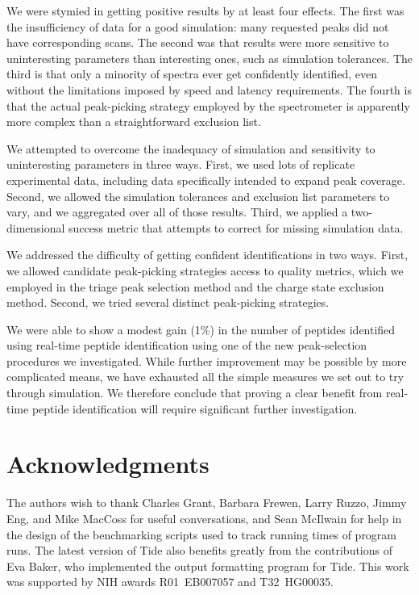 \documentclass[12pt,twoside,openright]{report}
\let\origdoublepage\cleardoublepage
\newcommand{\clearemptydoublepage}{
  \clearpage{\pagestyle{empty}\origdoublepage}
}
\let\cleardoublepage\clearemptydoublepage
\begin{document}
We were stymied in getting positive results by at least four effects. The first
was the insufficiency of data for a good simulation: many requested peaks did
not have corresponding scans. The second was that results were more
sensitive to uninteresting parameters than interesting ones, such as simulation
tolerances. The third is that only a minority of spectra ever get confidently
identified, even without the limitations imposed by speed and latency
requirements. The fourth is that the actual peak-picking strategy employed by
the spectrometer is apparently more complex than a straightforward exclusion
list.

We attempted to overcome the inadequacy of simulation and sensitivity to
uninteresting parameters in three ways. First, we used lots of replicate
experimental data, including data specifically intended to expand peak
coverage. Second, we allowed the simulation tolerances and exclusion list
parameters to vary, and we aggregated over all of those results. Third, we
applied a two-dimensional success metric that attempts to correct for missing
simulation data.

We addressed the difficulty of getting confident identifications in two
ways. First, we allowed candidate peak-picking strategies access to quality
metrics, which we employed in the triage peak selection method and the charge
state exclusion method. Second, we tried several distinct peak-picking
strategies.

We were able to show a modest gain (1\%) in the number of peptides identified
using real-time peptide identification using one of the new peak-selection
procedures we investigated. While further improvement may be possible by more
complicated means, we have exhausted all the simple measures we set out to try
through simulation. We therefore conclude that proving a clear benefit from
real-time peptide identification will require significant further investigation.

\cleardoublepage
\section*{Acknowledgments}

The authors wish to thank Charles Grant, Barbara Frewen, Larry Ruzzo, Jimmy Eng,
and Mike MacCoss for useful conversations, and Sean McIlwain for help in the
design of the benchmarking scripts used to track running times of program
runs. The latest version of Tide also benefits greatly from the contributions of
Eva Baker, who implemented the output formatting program for Tide.  This work
was supported by NIH awards R01~EB007057 and T32~HG00035.



\end{document}
